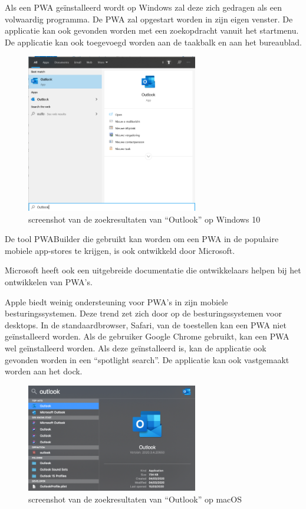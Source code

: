 		Als een PWA geïnstalleerd wordt op Windows zal deze zich gedragen als een volwaardig programma. De PWA zal opgestart worden in zijn eigen venster. De applicatie kan ook gevonden worden met een zoekopdracht vanuit het startmenu. De applicatie kan ook toegevoegd worden aan de taakbalk en aan het bureaublad.
		
		\begin{figure}[H]
			\centering
			\includegraphics[width=75mm]{./img/Outlook_search_windows.png}
			\caption{screenshot van de zoekresultaten van “Outlook” op Windows 10}
		\end{figure}
		
		
		De tool PWABuilder die gebruikt kan worden om een PWA in de populaire mobiele app-stores te krijgen, is ook ontwikkeld door Microsoft.
		\autocite{PWAbuilder2020}
		
		Microsoft heeft ook een uitgebreide documentatie die ontwikkelaars helpen bij het ontwikkelen van PWA's.
		\autocite{Microsoft2020b}
		
		
		Apple biedt weinig ondersteuning voor PWA's in zijn mobiele besturingssystemen. Deze trend zet zich door op de besturingssystemen voor desktops. In de standaardbrowser, Safari, van de toestellen kan een PWA niet geïnstalleerd worden. Als de gebruiker Google Chrome gebruikt, kan een PWA wel geïnstalleerd worden. Als deze geïnstalleerd is, kan de applicatie ook gevonden worden in een “spotlight search”. De applicatie kan ook vastgemaakt worden aan het dock.
		
		\begin{figure}[H]
			\centering
			\includegraphics[width=75mm]{./img/Outlook_search_mac.png}
			\caption{screenshot van de zoekresultaten van “Outlook” op macOS}
		\end{figure}
		
